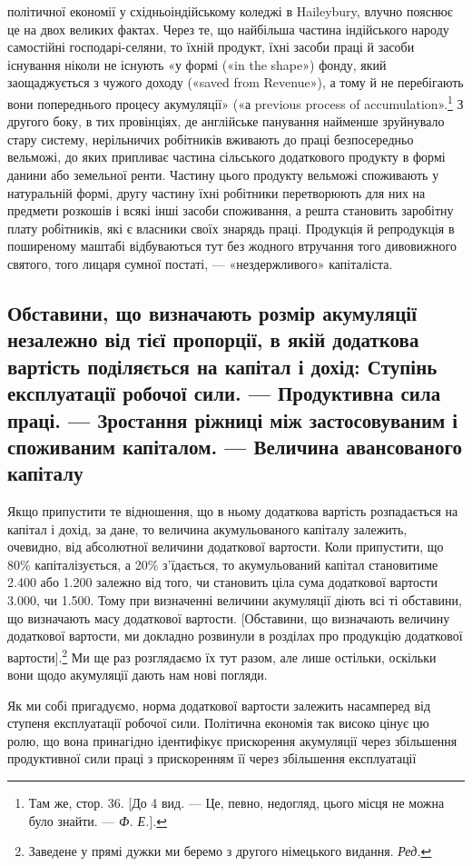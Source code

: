 \parcont{}  %
політичної економії у східньоіндійському коледжі в Haileybury,
влучно пояснює це на двох великих фактах. Через те, що
найбільша частина індійського народу самостійні господарі-селяни,
то їхній продукт, їхні засоби праці й засоби існування
ніколи не існують «у формі («in the shape») фонду, який заощаджується
з чужого доходу («saved from Revenue»), а тому
й не перебігають вони попереднього процесу акумуляції» («а
previous process of accumulation».\footnote{
Там же, стор. 36. [До 4 вид. — Це, певно, недогляд, цього місця
не можна було знайти. — \emph{Ф. Е.}].
} З другого боку, в тих провінціях,
де англійське панування найменше зруйнувало стару
систему, нерільничих робітників вживають до праці безпосередньо
вельможі, до яких припливає частина сільського додаткового продукту
в формі данини або земельної ренти. Частину цього продукту
вельможі споживають у натуральній формі, другу частину
їхні робітники перетворюють для них на предмети розкошів
і всякі інші засоби споживання, а решта становить заробітну
плату робітників, які є власники своїх знарядь праці. Продукція
й репродукція в поширеному маштабі відбуваються тут без
жодного втручання того дивовижного святого, того лицаря сумної
постаті, — «нездержливого» капіталіста.

\subsection{Обставини, що визначають розмір акумуляції незалежно від
тієї пропорції, в якій додаткова вартість поділяється на капітал
і дохід: Ступінь експлуатації робочої сили. — Продуктивна
сила праці. — Зростання ріжниці між застосовуваним і споживаним
капіталом. — Величина авансованого капіталу}

Якщо припустити те відношення, що в ньому додаткова вартість
розпадається на капітал і дохід, за дане, то величина акумульованого
капіталу залежить, очевидно, від абсолютної величини
додаткової вартости. Коли припустити, що 80\% капіталізується,
а 20\% з’їдається, то акумульований капітал становитиме
2.400 або 1.200 залежно
від того, чи становить ціла сума додаткової вартости 3.000, чи 1.500. Тому при визначенні
величини акумуляції діють всі ті обставини, що визначають масу
додаткової вартости. [Обставини, що визначають величину додаткової
вартости, ми докладно розвинули в розділах про продукцію
додаткової вартости].\footnote*{
Заведене у прямі дужки ми беремо з другого німецького видання.
\emph{Ред.}
} Ми ще раз розглядаємо їх тут
разом, але лише остільки, оскільки вони щодо акумуляції дають
нам нові погляди.

Як ми собі пригадуємо, норма додаткової вартости залежить
насамперед від ступеня експлуатації робочої сили. Політична
економія так високо цінує цю ролю, що вона принагідно ідентифікує
прискорення акумуляції через збільшення продуктивної
сили праці з прискоренням її через збільшення експлуатації
\parbreak{}  %
